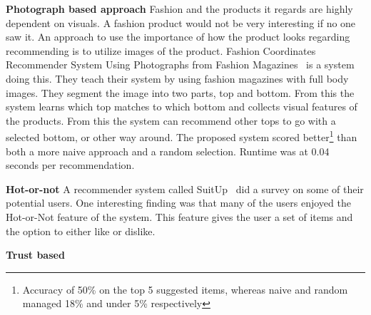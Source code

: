 \textbf{Photograph based approach}
Fashion and the products it regards are highly dependent on visuals.
A fashion product would not be very interesting if no one saw it. %
An approach to use the importance of how the product looks regarding recommending is to utilize images of the product.
Fashion Coordinates Recommender System Using Photographs from Fashion Magazines~\cite{Iwata:2011} is a system doing this.
They teach their system by using fashion magazines with full body images.
They segment the image into two parts, top and bottom.
From this the system learns which top matches to which bottom and collects visual features of the products.
From this the system can recommend other tops to go with a selected bottom, or other way around.
The proposed system scored better\footnote{Accuracy of 50\% on the top 5 suggested items, whereas naive and random managed 18\% and under 5\% respectively} than both a more naive approach and a random selection.
Runtime was at 0.04 seconds per recommendation.


\textbf{Hot-or-not}
A recommender system called SuitUp~\cite{SuitUp} did a survey on some of their potential users.
One interesting finding was that many of the users enjoyed the Hot-or-Not feature of the system.
This feature gives the user a set of items and the option to either like or dislike.

\textbf{Trust based}







